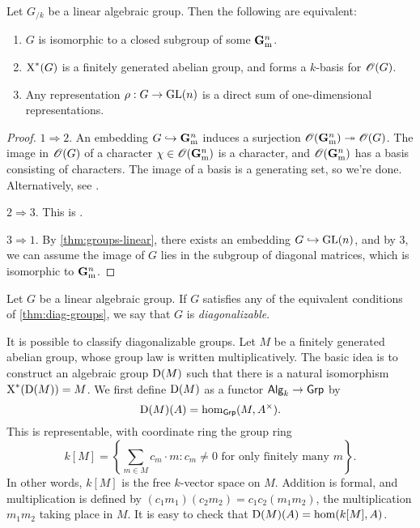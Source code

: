 \begin{theorem}\label{thm:diag-groups}
Let $G_{/k}$ be a linear algebraic group. Then the following are equivalent: 
\begin{enumerate}
\item
$G$ is isomorphic to a closed subgroup of some $\mathbf{G}_\mathrm{m}^n$. 

\item
$\operatorname{X}^\ast(G)$ is a finitely generated abelian group, and forms a $k$-basis 
for $\mathscr{O}(G)$. 

\item 
Any representation $\rho:G\to \operatorname{GL}(n)$ is a direct sum of one-dimensional 
representations. 
\end{enumerate}
\end{theorem}
\begin{proof}
$1\Rightarrow 2$. An embedding $G\hookrightarrow \mathbf{G}_\mathrm{m}^n$ induces a surjection 
$\mathscr{O}(\mathbf{G}_\mathrm{m}^n)\twoheadrightarrow \mathscr{O}(G)$. The image in $\mathscr{O}(G)$ of a character 
$\chi\in \mathscr{O}(\mathbf{G}_\mathrm{m}^n)$ is a character, and $\mathscr{O}(\mathbf{G}_\mathrm{m}^n)$ has a basis consisting 
of characters. The image of a basis is a generating set, so we're done. 
Alternatively, see \cite[14.8]{milne-iAG}. 

$2\Rightarrow 3$. This is \cite[14.11]{milne-iAG}. 

$3\Rightarrow 1$. By \autoref{thm:groups-linear}, there exists an embedding 
$G\hookrightarrow \operatorname{GL}(n)$, and by 3, we can assume the image of $G$ lies in the 
subgroup of diagonal matrices, which is isomorphic to $\mathbf{G}_\mathrm{m}^n$. 
\end{proof}

\begin{definition}
Let $G$ be a linear algebraic group. If $G$ satisfies any of the 
equivalent conditions of \autoref{thm:diag-groups}, we say that $G$ is 
\emph{diagonalizable}. 
\end{definition}

It is possible to classify diagonalizable groups. Let $M$ be a finitely 
generated abelian group, whose group law is written multiplicatively. The basic 
idea is to construct an algebraic group $\operatorname{D}(M)$ such that there is a 
natural isomorphism $\operatorname{X}^\ast(\operatorname{D}(M)) = M$. We first define $\operatorname{D}(M)$ as 
a functor $\mathsf{Alg}_{k}\to \mathsf{Grp}$ by 
\[
  \operatorname{D}(M)(A) = \hom_{\mathsf{Grp}}(M,A^\times) .
\]
This is representable, with coordinate ring the group ring 
\[
  k[M] = \left\{\sum_{m\in M} c_m\cdot m : c_m\ne 0\text{ for only finitely many }m\right\} .
\]
In other words, $k[M]$ is the free $k$-vector space on $M$. Addition is formal, 
and multiplication is defined by $(c_1 m_1)(c_2 m_2) = c_1 c_2 (m_1 m_2)$, the 
multiplication $m_1 m_2$ taking place in $M$. It is easy to check that 
$\operatorname{D}(M)(A)=\hom(k[M],A)$. 

